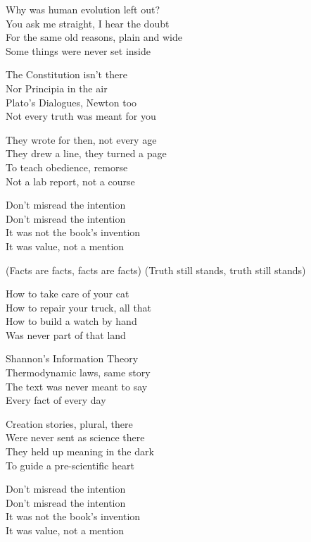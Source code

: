 \begin{lyrics}
Why was human evolution left out?\\
You ask me straight, I hear the doubt\\
For the same old reasons, plain and wide\\
Some things were never set inside

The Constitution isn’t there\\
Nor Principia in the air\\
Plato’s Dialogues, Newton too\\
Not every truth was meant for you

They wrote for then, not every age\\
They drew a line, they turned a page\\
To teach obedience, remorse\\
Not a lab report, not a course

Don’t misread the intention\\
Don’t misread the intention\\
It was not the book’s invention\\
It was value, not a mention

(Facts are facts, facts are facts)
(Truth still stands, truth still stands)

How to take care of your cat\\
How to repair your truck, all that\\
How to build a watch by hand\\
Was never part of that land

Shannon’s Information Theory\\
Thermodynamic laws, same story\\
The text was never meant to say\\
Every fact of every day

Creation stories, plural, there\\
Were never sent as science there\\
They held up meaning in the dark\\
To guide a pre-scientific heart

Don’t misread the intention\\
Don’t misread the intention\\
It was not the book’s invention\\
It was value, not a mention


\end{lyrics}
